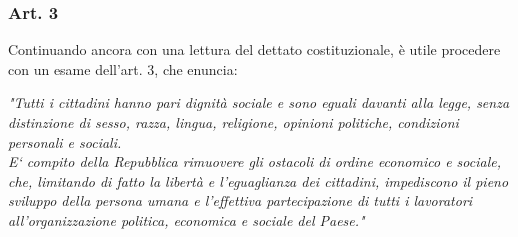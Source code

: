 \subsubsection{Art. 3}
Continuando ancora con una lettura del dettato costituzionale, è utile procedere con un esame dell'art. 3, che enuncia:

\textit{"Tutti i cittadini hanno pari dignità sociale e sono eguali davanti alla legge, senza distinzione di sesso, razza, lingua, religione, opinioni politiche, condizioni personali e sociali.
	\\E` compito della Repubblica rimuovere gli ostacoli di ordine economico e sociale, che, limitando di fatto la libertà e l'eguaglianza dei cittadini, impediscono il pieno sviluppo della persona umana e l'effettiva partecipazione di tutti i lavoratori all'organizzazione politica, economica e sociale del Paese."}


